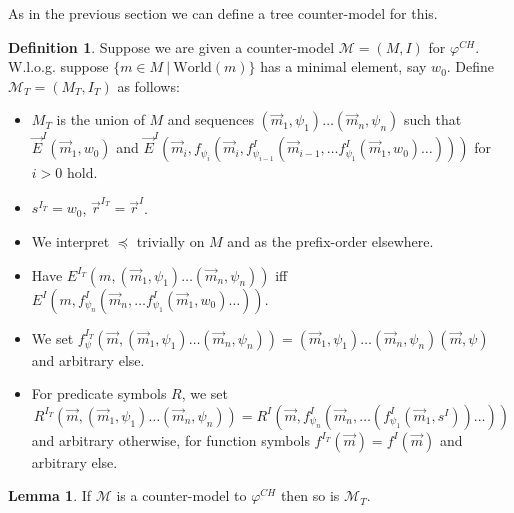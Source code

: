 \documentclass{easychair}
\theoremstyle{definition}
\theoremstyle{definition}
\theoremstyle{definition}
\newtheorem{lemma}[theorem]{Lemma}
\theoremstyle{definition}
\theoremstyle{definition}
\newtheorem{definition}[theorem]{Definition}
\theoremstyle{definition}
\theoremstyle{definition}
\begin{document}
As in the previous section we can define a tree counter-model for this.
\begin{definition}
	Suppose we are given a counter-model $\mathcal M = (M, I)$ for $\varphi^{CH}$. W.l.o.g. suppose $\{m\in M\:|\:\text{World}(m)\}$ has a minimal element, say $w_0$. Define $\mathcal M_T = (M_T, I_T)$ as follows:
	\begin{itemize}
		\item $M_T$ is the union of $M$ and sequences $(\vec m_1, \psi_1)\dots (\vec m_n, \psi_n)$ such that $\vec E^I(\vec m_1, w_0)$ and $\vec E^I(\vec m_i, f_{\psi_i}(\vec m_i, f_{\psi_{i-1}}^I(\vec m_{i-1}, \dots f_{\psi_1}^I(\vec m_1, w_0)\dots)))$ for $i > 0$ hold.
		\item $s^{I_T} = w_0$, $\vec r^{I_T} = \vec r^I$.
		\item We interpret $\preceq$ trivially on $M$ and as the prefix-order elsewhere.
		\item Have $E^{I_T}(m, (\vec m_1, \psi_1)\dots (\vec m_n, \psi_n))$ iff $E^I(m, f_{\psi_n}^I(\vec m_n, \dots f_{\psi_1}^I(\vec m_1, w_0)\dots))$.
		\item We set $f_\psi^{I_T}(\vec m, (\vec m_1, \psi_1)\dots (\vec m_n, \psi_n)) = (\vec m_1, \psi_1)\dots (\vec m_n, \psi_n)(\vec m, \psi)$ and arbitrary else.
		\item For predicate symbols $R$, we set $${R}^{I_T}(\vec m, (\vec m_1, \psi_1)\dots (\vec m_n, \psi_n)) = {R}^I(\vec m, f_{\psi_n}^I(\vec m_n, \dots(f_{\psi_1}^I(\vec m_1, s^I))\dots))$$ and arbitrary otherwise, for function symbols $f^{I_T}(\vec m) = f^I(\vec m)$ and arbitrary else.
	\end{itemize}
\end{definition}

\begin{lemma}
	If $\mathcal M$ is a counter-model to $\varphi^{CH}$ then so is $\mathcal M_T$.
\end{lemma}
\end{document}
